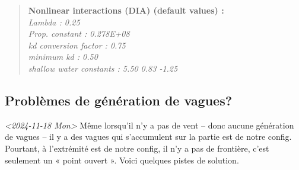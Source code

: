 \documentclass[10pt]{article}
\numberwithin{equation}{section}
\begin{document}
\begin{quote}
\textbf{Nonlinear interactions (DIA) (default values) :}\\
    \emph{Lambda                      :    0.25}\\
    \emph{Prop. constant              : 0.278E+08}\\
    \emph{kd conversion factor        :    0.75}\\
    \emph{minimum kd                  :    0.50}\\
    \emph{shallow water constants     :    5.50  0.83 -1.25}
\end{quote}
\subsection{Problèmes de génération de vagues?}
\label{sec:orga2ab524}

\textit{<2024-11-18 Mon> } Même lorsqu'il n'y a pas de vent -- donc aucune génération de vagues -- il y a des vagues qui s'accumulent sur la partie est de notre config. Pourtant, à l'extrémité est de notre config, il n'y a pas de frontière, c'est seulement un « point ouvert ». Voici quelques pistes de solution. 
\end{document}
